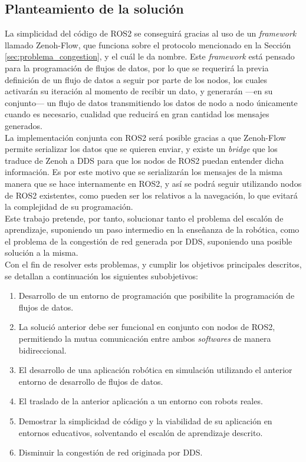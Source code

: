 \subsection{Planteamiento de la solución}
\label{sec:planteamiento_solucion}

La simplicidad del código de ROS2 se conseguirá gracias al uso de un
\textit{framework} llamado Zenoh-Flow, que funciona sobre el protocolo
mencionado en la Sección \ref{sec:problema_congestion}, y el cuál le da
nombre.
Este \textit{framework} está pensado para la programación de flujos de datos,
por lo que se requerirá la previa definición de un flujo de datos a seguir por
parte de los nodos, los cuales activarán su iteración al momento de recibir un
dato, y generarán ---en su conjunto--- un flujo de datos transmitiendo los datos
de nodo a nodo únicamente cuando es necesario, cualidad que reducirá en gran
cantidad los mensajes generados.
\\

La implementación conjunta con ROS2 será posible gracias a que Zenoh-Flow
permite serializar los datos que se quieren enviar, y existe un \textit{bridge}
que los traduce de Zenoh a DDS para que los nodos de ROS2 puedan entender dicha
información.
Es por este motivo que se serializarán los mensajes de la misma manera que se
hace internamente en ROS2, y así se podrá seguir utilizando nodos de ROS2
existentes, como pueden ser los relativos a la navegación, lo que evitará la
complejidad de su programación.
\\

Este trabajo pretende, por tanto, solucionar tanto el problema del escalón de
aprendizaje, suponiendo un paso intermedio en la enseñanza de la robótica, como
el problema de la congestión de red generada por DDS, suponiendo una posible
solución a la misma.
\\

Con el fin de resolver ests problemas, y cumplir los objetivos principales
descritos, se detallan a continuación los siguientes subobjetivos:

\begin{enumerate}
    \item{Desarrollo de un entorno de programación que posibilite la
        programación de flujos de datos.}
    \item{La solució anterior debe ser funcional en conjunto con nodos de ROS2,
        permitiendo la mutua comunicación entre ambos \textit{softwares} de
        manera bidireccional.}
    \item{El desarrollo de una aplicación robótica en simulación utilizando el
        anterior entorno de desarrollo de flujos de datos.}
    \item{El traslado de la anterior aplicación a un entorno con robots reales.}
    \item{Demostrar la simplicidad de código y la viabilidad de su aplicación en
        entornos educativos, solventando el escalón de aprendizaje descrito.}
    \item{Disminuir la congestión de red originada por DDS.}
\end{enumerate}

